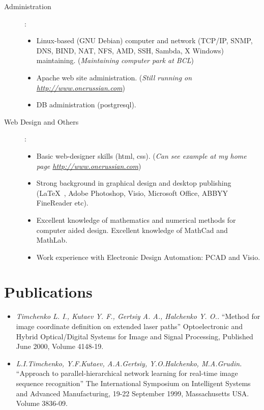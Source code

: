 \documentclass[10pt,overlapped,line]{res}
\newcommand{\wdescription}[1]{({\small \textit{#1}})}
\newcommand{\mtitle}[1]{``#1''}
\newcommand{\mauthors}[1]{ \textit{#1.}}
\newcommand{\mwhere}[1]{#1.}
\begin{document}
\begin{resume}
\begin{description}
   \item[Administration]:\\ 
     \begin{itemize}
     \item Linux-based (GNU Debian) computer and network (TCP/IP,
       SNMP, DNS, BIND, NAT, NFS, AMD, SSH, Sambda, X Windows) maintaining. 
       \wdescription{Maintaining computer park at BCL}
     \item Apache web site administration.
       \wdescription{Still running on \href{URL}{http://www.onerussian.com}}
     \item DB administration (postgresql).
     \end{itemize}

   \item[Web Design and Others]:\\
     \begin{itemize}
     \item Basic web-designer skills (html, css).
       \wdescription{Can see example at my home page \href{URL}{http://www.onerussian.com}}
     \item Strong background in graphical design and desktop
       publishing (\LaTeX\ , Adobe Photoshop, Visio, Microsoft Office, ABBYY
       FineReader etc).
     \item Excellent knowledge of mathematics and numerical methods
       for computer aided design. Excellent knowledge of MathCad and
       MathLab.
     \item Work experience with Electronic Design Automation: PCAD and
       Visio.
     \end{itemize}
 \end{description}

\section{Publications}

\begin{itemize}
 
 \item 
    \mauthors{Timchenko L. I., Kutaev Y. F., Gertsiy A. A., Halchenko Y. O.}
    \mtitle{Method for image coordinate definition on extended laser paths} 
    \mwhere{Optoelectronic and Hybrid Optical/Digital Systems for Image and Signal Processing, Published June 2000,  Volume 4148-19}

 \item 
    \mauthors{L.I.Timchenko, Y.F.Kutaev, A.A.Gertsiy, Y.O.Halchenko, M.A.Grudin} 
    \mtitle{Approach to parallel-hierarchical network learning for real-time image sequence recognition} 
    \mwhere{The International Symposium on Intelligent Systems and Advanced Manufacturing, 19-22 September 1999, Massachusetts USA. Volume 3836-09}


\end{itemize}
\end{resume}
\end{document}
